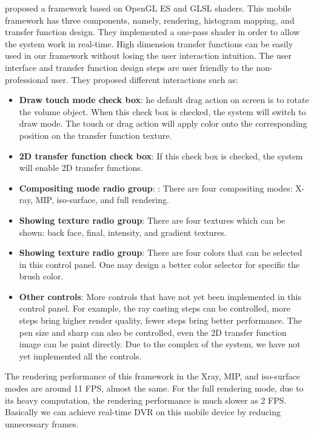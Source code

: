 \cite{7852799} proposed a framework based on OpenGL ES and GLSL shaders. This
mobile framework has three components, namely, rendering,
histogram mapping, and transfer function design. They
implemented a one-pass shader in order to allow the system
work in real-time. High dimension transfer functions can
be easily used in our framework without losing the user
interaction intuition. The user interface and transfer function
design steps are user friendly to the non-professional user. They proposed different interactions such as:
\begin{itemize}
\item \textbf{Draw touch mode check box}: he default drag action
on screen is to rotate the volume object. When this
check box is checked, the system will switch to draw
mode. The touch or drag action will apply color onto the
corresponding position on the transfer function texture.
\item \textbf{2D transfer function check box}: If this check box is
checked, the system will enable 2D transfer functions.
\item \textbf{Compositing mode radio group}: : There are four
compositing modes: X-ray, MIP, iso-surface, and full
rendering.
\item \textbf{Showing texture radio group}: There are four textures
which can be shown: back face, final, intensity, and
gradient textures.
\item \textbf{Showing texture radio group}: There are four colors that can
be selected in this control panel. One may design a
better color selector for specific the brush color.
\item \textbf{Other controls}: More controls that have not yet been
implemented in this control panel. For example, the ray
casting steps can be controlled, more steps bring higher
render quality, fewer steps bring better performance. The
pen size and sharp can also be controlled, even the 2D
transfer function image can be paint directly. Due to the
complex of the system, we have not yet implemented all
the controls.
\end{itemize}
The rendering performance of this framework in the Xray,
MIP, and iso-surface modes are around 11 FPS, almost
the same. For the full rendering mode, due to its heavy
computation, the rendering performance is much slower as 2
FPS. Basically we can achieve real-time DVR on this mobile
device by reducing unnecessary frames.



